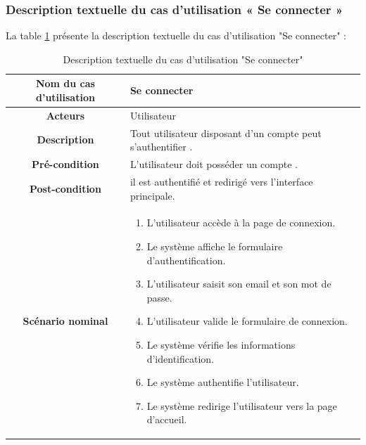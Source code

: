 \subsubsection{Description textuelle du cas d’utilisation « Se connecter »} 
La table \ref{tab:connexion} présente la description textuelle du cas d’utilisation "Se connecter" :
\begin{longtable}{|c|p{11cm}|}
\caption{Description textuelle du cas d’utilisation "Se connecter"}
\label{tab:connexion} \\
\hline
\cellcolor{coloranihub} \textbf{Nom du cas d'utilisation } & Se connecter \\
\hline
\cellcolor{coloranihub} \textbf{Acteurs} & Utilisateur \\
\hline
\cellcolor{coloranihub} \textbf{Description } & Tout utilisateur disposant d’un compte peut s’authentifier . \\
\hline
\cellcolor{coloranihub} \textbf{Pré-condition } & L’utilisateur doit posséder un compte . \\
\hline
\cellcolor{coloranihub} \textbf{Post-condition } & il est authentifié et redirigé vers l’interface principale. \\
\hline
\cellcolor{coloranihub} \textbf{Scénario nominal } & 
\begin{enumerate}
\item L’utilisateur accède à la page de connexion.
\item Le système affiche le formulaire d’authentification.
\item L’utilisateur saisit son email et son mot de passe.
\item L’utilisateur valide le formulaire de connexion.
\item Le système vérifie les informations d’identification.
\item Le système authentifie l’utilisateur.
\item Le système redirige l’utilisateur vers la page d’accueil.
\end{enumerate} \\
\hline
\end{longtable}



\newpage


\newpage 

